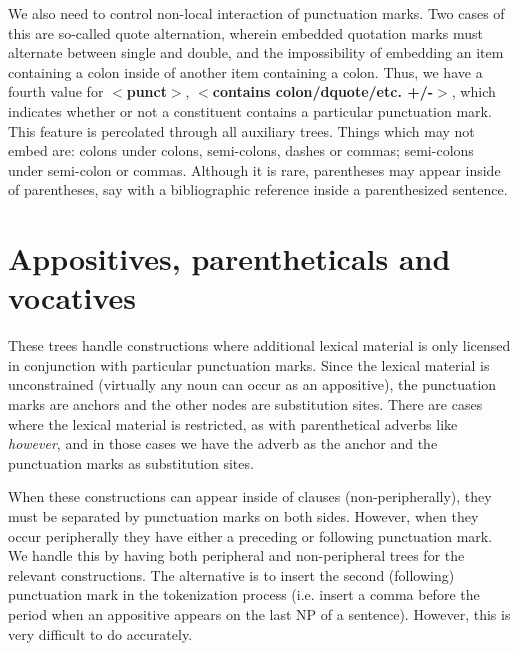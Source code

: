 We also need to control non-local interaction of punctuation
marks. Two cases of this are so-called quote alternation, wherein
embedded quotation marks must alternate between single and double, and
the impossibility of embedding an item containing a colon inside of
another item containing a colon. Thus, we have a fourth value for {\bf
$<$punct$>$}, {\bf $<$contains colon/dquote/etc. +/-$>$}, which
indicates whether or not a constituent contains a particular
punctuation mark. This feature is percolated through all auxiliary
trees.  Things which may not embed are: colons under colons,
semi-colons, dashes or commas; semi-colons under semi-colon or commas.
Although it is rare, parentheses may appear inside of parentheses, say
with a bibliographic reference inside a parenthesized sentence.
 


\section{Appositives, parentheticals and vocatives}

These trees handle constructions where additional lexical material is
only licensed in conjunction with particular punctuation marks. Since
the lexical material is unconstrained (virtually any noun can occur as
an appositive), the punctuation marks are anchors and the other nodes
are substitution sites. There are cases where the lexical material is
restricted, as with parenthetical adverbs like {\it however}, and in
those cases we have the adverb as the anchor and the punctuation marks
as substitution sites.

When these constructions can appear inside of clauses
(non-peripherally), they must be separated by punctuation marks on
both sides. However, when they occur peripherally they have either a
preceding or following punctuation mark. We handle this by having
both peripheral and non-peripheral trees for the relevant
constructions. The alternative is to insert the second (following)
punctuation mark in the tokenization process (i.e. insert a comma
before the period when an appositive appears on the last NP of a
sentence). However, this is very difficult to do accurately.

